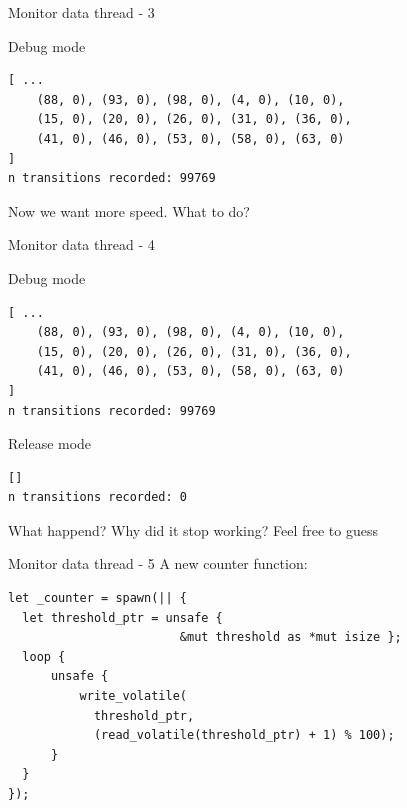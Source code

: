 \documentclass[10pt,aspectratio=169]{beamer}
\begin{document}
\begin{frame}[fragile]{Monitor data thread - 3}

      \begin{alertblock}{Debug mode}
\begin{verbatim}
[ ...
    (88, 0), (93, 0), (98, 0), (4, 0), (10, 0),
    (15, 0), (20, 0), (26, 0), (31, 0), (36, 0),
    (41, 0), (46, 0), (53, 0), (58, 0), (63, 0)
]
n transitions recorded: 99769
\end{verbatim}
      \end{alertblock}

    Now we want more speed. What to do?
\end{frame}
\begin{frame}[fragile]{Monitor data thread - 4}

      \begin{block}{Debug mode}
\begin{verbatim}
[ ...
    (88, 0), (93, 0), (98, 0), (4, 0), (10, 0),
    (15, 0), (20, 0), (26, 0), (31, 0), (36, 0),
    (41, 0), (46, 0), (53, 0), (58, 0), (63, 0)
]
n transitions recorded: 99769
\end{verbatim}
      \end{block}

    \begin{alertblock}{Release mode}
\begin{verbatim}
[]
n transitions recorded: 0
\end{verbatim}
      \end{alertblock}

    What happend? Why did it stop working? Feel free to guess
\end{frame}

\begin{frame}[fragile]{Monitor data thread - 5}
    A new counter function:
\begin{verbatim}
let _counter = spawn(|| {
  let threshold_ptr = unsafe {
                        &mut threshold as *mut isize };
  loop {
      unsafe {
          write_volatile(
            threshold_ptr,
            (read_volatile(threshold_ptr) + 1) % 100);
      }
  }
});
\end{verbatim}
\end{frame}
\end{document}
